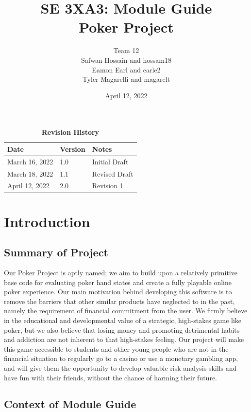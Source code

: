 \documentclass[12pt, titlepage]{article}
\title{SE 3XA3: Module Guide \\Poker Project}
\author{Team 12
        \\ Safwan Hossain and hossam18
        \\ Eamon Earl and earle2
        \\ Tyler Magarelli and magarelt
}
\date{April 12, 2022}
\begin{document}
\maketitle

\tableofcontents
\listoftables
\listoffigures

\begin{table}[bp]
\caption{\bf Revision History}
\begin{tabularx}{\textwidth}{p{3cm}p{2cm}X}
\toprule {\bf Date} & {\bf Version} & {\bf Notes}\\
\midrule
March 16, 2022 & 1.0 & Initial Draft\\
March 18, 2022 & 1.1 & Revised Draft\\
April 12, 2022 & 2.0 & Revision 1\\
\bottomrule
\end{tabularx}
\end{table}

\newpage


\section{Introduction}

\subsection{Summary of Project}

Our Poker Project is aptly named; we aim to build upon a relatively primitive base code for evaluating poker hand states and create a fully playable online poker experience. Our main motivation behind developing this software is to remove the barriers that other similar products have neglected to in the past, namely the requirement of financial commitment from the user. We firmly believe in the educational and developmental value of a strategic, high-stakes game like poker, but we also believe that losing money and promoting detrimental habits and addiction are not inherent to that high-stakes feeling. Our project will make this game accessible to students and other young people who are not in the financial situation to regularly go to a casino or use a monetary gambling app, and will give them the opportunity to develop valuable risk analysis skills and have fun with their friends, without the chance of harming their future. 

\subsection{Context of Module Guide}
\end{document}

